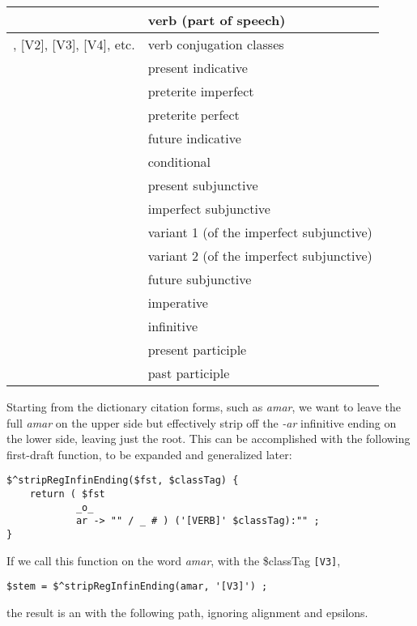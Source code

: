 \begin{center}
\begin{tabular}{|l|l|}
\hline
[VERB] & verb (part of speech) \\
\hline
[V1], [V2], [V3], [V4], etc. & verb conjugation classes\\
\hline
[PresIndic] & present indicative\\
\hline
[PretImperf] & preterite imperfect\\
\hline
[PretPerf] & preterite perfect\\
\hline
[FutIndic] & future indicative\\
\hline
[Cond] & conditional\\
\hline
[PresSubj] & present subjunctive\\
\hline
[ImperfSubj] & imperfect subjunctive\\
\hline
[Var1] & variant 1 (of the imperfect subjunctive)\\
\hline
[Var2] & variant 2 (of the imperfect subjunctive)\\
\hline
[FutSubj] & future subjunctive\\
\hline
[Imptv] & imperative\\
\hline
[Infin] & infinitive\\
\hline
[PresPart] & present participle\\
\hline
[PastPart] & past participle\\
\hline
\end{tabular}
\end{center}

Starting from the dictionary citation forms, such as \emph{amar}, we want to
leave the full \emph{amar} on the upper side but
effectively strip off the \emph{-ar} infinitive ending on the lower side, leaving
just the root.  This can be accomplished with the following first-draft function,
to be expanded and generalized later:


\begin{Verbatim}
$^stripRegInfinEnding($fst, $classTag) {
    return ( $fst 
            _o_
            ar -> "" / _ # ) ('[VERB]' $classTag):"" ;
}
\end{Verbatim}

\noindent
If we call this function on the word \emph{amar}, with the \$classTag
\verb![V3]!,


\begin{Verbatim}
$stem = $^stripRegInfinEnding(amar, '[V3]') ;
\end{Verbatim}

\noindent
the result is
an \fsm{} with the following path, ignoring alignment and epsilons.

